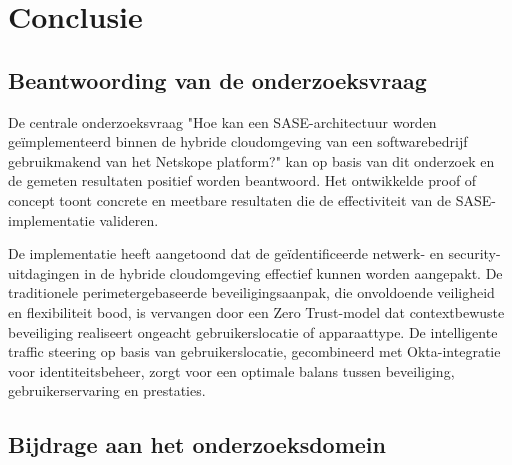 
\chapter{Conclusie}%
\label{ch:conclusie}


\section{Beantwoording van de onderzoeksvraag}

De centrale onderzoeksvraag "Hoe kan een SASE-architectuur worden geïmplementeerd binnen de hybride cloudomgeving van een softwarebedrijf gebruikmakend van het Netskope platform?" kan op basis van dit onderzoek en de gemeten resultaten positief worden beantwoord. Het ontwikkelde proof of concept toont concrete en meetbare resultaten die de effectiviteit van de SASE-implementatie valideren.

\vspace{2ex}

De implementatie heeft aangetoond dat de geïdentificeerde netwerk- en security-uitdagingen in de hybride cloudomgeving effectief kunnen worden aangepakt. De traditionele perimetergebaseerde beveiligingsaanpak, die onvoldoende veiligheid en flexibiliteit bood, is vervangen door een Zero Trust-model dat contextbewuste beveiliging realiseert ongeacht gebruikerslocatie of apparaattype. De intelligente traffic steering op basis van gebruikerslocatie, gecombineerd met Okta-integratie voor identiteitsbeheer, zorgt voor een optimale balans tussen beveiliging, gebruikerservaring en prestaties.

\section{Bijdrage aan het onderzoeksdomein}

